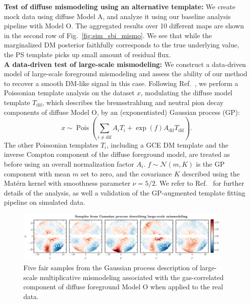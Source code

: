 \documentclass[prd,aps,10pt,nofootinbib,twocolumn,superscriptaddress,preprintnumbers,balancelastpage,longbibliography]{revtex4-1}
\begin{document}
\noindent
\textbf{Test of diffuse mismodeling using an alternative template:}
We create mock data using diffuse Model A, and analyze it using our baseline analysis pipeline with Model O. The aggregated results over 10 different maps are shown in the second row of Fig.~\ref{fig:sim_sbi_mismo}. We see that while the marginalized DM posterior faithfully corresponds to the true underlying value, the PS template picks up small amount of residual flux. \\

\noindent
\textbf{A data-driven test of large-scale mismodeling:}
We construct a data-driven model of large-scale foreground mismodeling and assess the ability of our method to recover a smooth DM-like signal in this case. Following Ref.~\cite{Mishra-Sharma:2020kjb}, we perform a Poissonian template analysis on the \Fermi dataset $x$, modulating the diffuse model template $T_{\mathrm{dif}}$, which describes the bremsstrahlung and neutral pion decay components of diffuse Model O, by an (exponentiated) Gaussian process (GP):
\begin{equation}
x \sim \operatorname{Pois}\left(\sum_{i \neq \mathrm{dif}} A_{i} T_{i}+\exp \left(f\right) A_{\mathrm{dif}} T_{\mathrm{dif}}\right).
\end{equation}
The other Poissonian templates $T_{i}$, including a GCE DM template and the inverse Compton component of the diffuse foreground model, are treated as before using an overall normalization factor $A_{i}$. $f \sim \mathcal{N}(m, K)$ is the GP component with mean $m$ set to zero, and the covariance $K$ described using the Mat\'ern kernel with smoothness parameter $\nu = 5/2$. We refer to Ref.~\cite{Mishra-Sharma:2020kjb} for further details of the analysis, as well a validation of the GP-augmented template fitting pipeline on simulated data.

%
\begin{figure}
\centering
\includegraphics[width=0.95\textwidth]{plots/dd_mismo_map.pdf}
\caption{Five fair samples from the Gaussian process description of large-scale multiplicative mismodeling associated with the gas-correlated component of diffuse foreground Model O when applied to the real \Fermi data.}
\label{fig:dd_mismo_map}
\end{figure}
%
\end{document}
